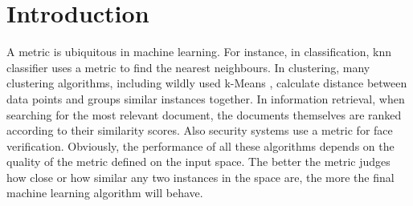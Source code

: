 \documentclass[12pt,a4paper]{report}
\begin{document}



\tableofcontents







\chapter{Introduction} \label{chap:intro}

A metric is ubiquitous in machine learning. For instance, in classification, \ac{knn} classifier \citep{cover1967nearest} uses a metric to find the nearest neighbours. In clustering, many clustering algorithms, including wildly used k-Means \citep{hartigan1979algorithm}, calculate distance between data points and groups similar instances together. In information retrieval, when searching for the most relevant document, the documents themselves are ranked according to their similarity scores. Also security systems use a metric for face verification. Obviously, the performance of all these algorithms depends on the quality of the metric defined on the input space. The better the metric judges how close or how similar any two instances in the space are, the more the final machine learning algorithm will behave.
\end{document}
